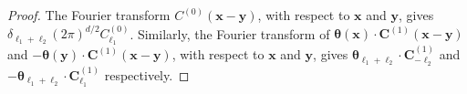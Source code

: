 \documentclass[10pt,noinfoline]{imsart}
\newcommand{\bs}{\boldsymbol}
\begin{document}
\begin{proof}
The Fourier transform $C^{(0)}(\bs x-\bs y)$, with respect to $\bs x$ and $\bs y$, gives  $\delta_{\bs \ell_1 + \bs \ell_2} {(2\pi)}^{d/2} C^{(0)}_{\bs \ell_1}$. 
Similarly, the Fourier transform of $\bs\theta(\bs x)\cdot \bs C^{(1)}(\bs x-\bs y)$ and $- \bs\theta(\bs y)\cdot \bs C^{(1)}(\bs x-\bs y)$, with respect to $\bs x$ and $\bs y$, gives $\bs\theta_{\bs\ell_1+\bs\ell_2}\cdot  \bs C^{(1)}_{-\bs\ell_2}$ and $-\bs\theta_{\bs \ell_1+\bs \ell_2} \cdot  \bs C^{(1)}_{\bs\ell_1}$ respectively.

\end{proof}
\end{document}
